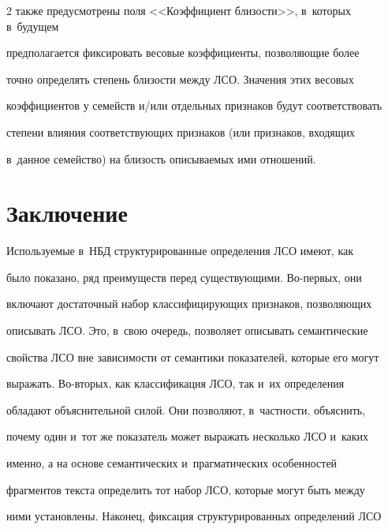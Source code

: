 \begin{multicols}{2}
также предусмотрены поля <<Коэффициент близости>>, в~которых в~будущем 


предполагается фиксировать весовые коэффициенты, позволяющие более 


точно определять степень близости между ЛСО. Значения этих весовых 


коэффициентов у семейств и/или отдельных признаков будут соответствовать 


степени влияния соответствующих признаков (или признаков, входящих 


в~данное семейство) на близость описываемых ими отношений.





\vspace*{-9pt}





\section{Заключение}





\vspace*{-3pt}





   Используемые в~НБД структурированные определения ЛСО имеют, как 


было показано, ряд преимуществ перед существующими. Во-пер\-вых, они 


включают достаточный набор классифицирующих признаков, позволяющих 


описывать ЛСО. Это, в~свою очередь, позволяет описывать семантические 


свойства ЛСО вне зависимости от семантики показателей, которые его могут 


выражать. Во-вто\-рых, как классификация ЛСО, так и~их определения 


обладают объяснительной силой. Они позволяют, в~част\-ности, объяснить, 


почему один и~тот же показатель может выражать несколько ЛСО и~каких 


именно, а на основе семантических и~прагматических особенностей 


фрагментов текста определить тот набор ЛСО, которые могут быть между 


ними установлены. Наконец, фиксация структурированных определений ЛСО 



\end{multicols}
